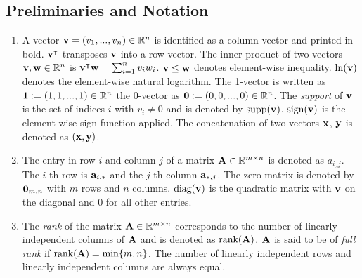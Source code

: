
\subsection*{Preliminaries and Notation}

\begin{enumerate}
    
    \item A vector $\bold{v} = (v_1, ..., v_n) \in \mathbb{R}^n$ is identified as a column vector and printed in bold. $\bold v^\intercal$ transposes $\bold v$ into a row vector. The inner product of two vectors $\bold v, \bold w \in \mathbb{R}^n$ is $\bold v^\intercal \bold w = \sum_{i=1}^n v_i w_i$. $\bold v \leq \bold w$ denotes element-wise inequality. $\ln (\bold v)$ denotes the element-wise natural logarithm. 
    The 1-vector is written as $\bold 1 := (1, 1, ..., 1) \in \mathbb{R}^n$ the 0-vector as $\bold 0 := (0, 0, ..., 0) \in \mathbb{R}^n$. The \textit{support} of $\bold{v}$ is the set of indices $i$ with $v_i \neq 0$ and is denoted by $\text{supp}(\bold v)$. $\text{sign}(\bold v)$ is the element-wise sign function applied.
    The concatenation of two vectors $\bold x$, $\bold y$ is denoted as $(\bold x, \bold y)$.

    \item The entry in row $i$ and column $j$ of a matrix $ \bold A \in \mathbb{R}^{m \times n}$ is denoted as $a_{i,j}$. The $i$-th row is $\bold a_{i,*}$ and the $j$-th column $\bold a_{*,j}$.  The zero matrix is denoted by $\bold 0_{m,n}$ with $m$ rows and $n$ columns. $\text{diag}(\bold v)$ is the quadratic matrix with $\bold v$ on the diagonal and 0 for all other entries.
    
    \item The \textit{rank} of the matrix $\bold A \in \mathbb{R}^{m \times n}$ corresponds to the number of linearly independent columns of $\bold A$ and is denoted as $\text{rank}(\bold A)$. $\bold A$ is said to be of \textit{full rank} if $\text{rank}(\bold A) = \min \{ m, n\}$. The number of linearly independent rows and linearly independent columns are always equal.
    

\end{enumerate}

